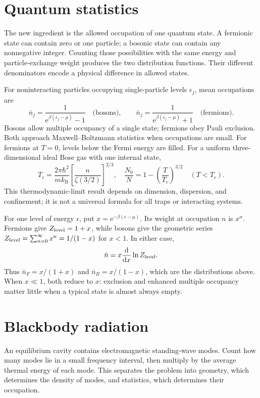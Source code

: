 \documentclass[11pt,oneside]{book}
\newcommand{\dd}{\mathrm{d}}
\newcommand{\ee}{\mathrm{e}}
\newcommand{\od}[2]{\frac{\dd #1}{\dd #2}}
\newcommand{\kb}{k_{\mathrm B}}
\theoremstyle{reviewstyle}
\begin{document}
\section{Quantum statistics}
The new ingredient is the allowed occupation of one quantum state. A fermionic state can contain zero or one particle; a bosonic state can contain any nonnegative integer. Counting those possibilities with the same energy and particle-exchange weight produces the two distribution functions. Their different denominators encode a physical difference in allowed states.

For noninteracting particles occupying single-particle levels $\epsilon_j$, mean occupations are
\begin{equation}
\bar n_j=\frac1{\ee^{\beta(\epsilon_j-\mu)}-1}\quad\text{(bosons)},\qquad
\bar n_j=\frac1{\ee^{\beta(\epsilon_j-\mu)}+1}\quad\text{(fermions)}.
\end{equation}
Bosons allow multiple occupancy of a single state; fermions obey Pauli exclusion. Both approach Maxwell--Boltzmann statistics when occupations are small. For fermions at $T=0$, levels below the Fermi energy are filled. For a uniform three-dimensional ideal Bose gas with one internal state,
\begin{equation}
T_c=\frac{2\pi\hbar^2}{m\kb}\left[\frac{n}{\zeta(3/2)}\right]^{2/3},\quad
\frac{N_0}{N}=1-\left(\frac{T}{T_c}\right)^{3/2}\quad(T<T_c).
\end{equation}
This thermodynamic-limit result depends on dimension, dispersion, and confinement; it is not a universal formula for all traps or interacting systems.

For one level of energy $\epsilon$, put $x=\ee^{-\beta(\epsilon-\mu)}$. Its weight at occupation $n$ is $x^n$. Fermions give $Z_{\rm level}=1+x$, while bosons give the geometric series $Z_{\rm level}=\sum_{n=0}^\infty x^n=1/(1-x)$ for $x<1$. In either case,
\begin{equation}
\bar n=x\od{}{x}\ln Z_{\rm level}.
\end{equation}
Thus $\bar n_F=x/(1+x)$ and $\bar n_B=x/(1-x)$, which are the distributions above. When $x\ll1$, both reduce to $x$: exclusion and enhanced multiple occupancy matter little when a typical state is almost always empty.

\section{Blackbody radiation}
An equilibrium cavity contains electromagnetic standing-wave modes. Count how many modes lie in a small frequency interval, then multiply by the average thermal energy of each mode. This separates the problem into geometry, which determines the density of modes, and statistics, which determines their occupation.
\end{document}
